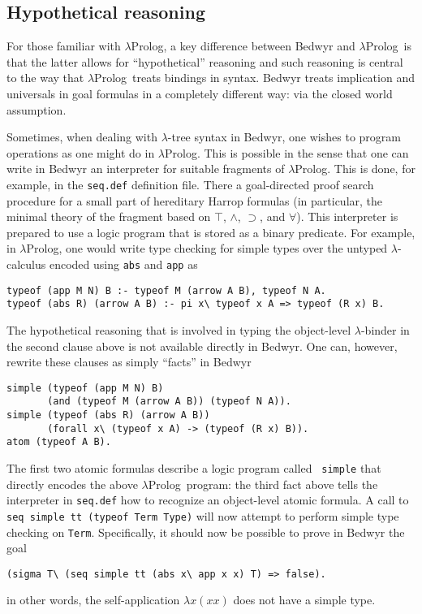 \documentclass{article}
\newcommand{\lp}{$\lambda$Prolog}
\begin{document}
\subsection{Hypothetical reasoning}

For those familiar with \lp, a key difference between
Bedwyr and \lp\ is that the latter allows for ``hypothetical''
reasoning and such reasoning is central to the way that \lp\ treats
bindings in syntax.    Bedwyr treats implication and universals in
goal formulas in a completely different way: via the closed world
assumption.  

Sometimes, when dealing with $\lambda$-tree syntax in Bedwyr, one
wishes to program operations as one might do in \lp.  This is possible
in the sense that one can write in Bedwyr an interpreter for suitable
fragments of \lp.  This is done, for example, in the {\tt seq.def}
definition file.  There a goal-directed proof search procedure for a
small part of hereditary Harrop formulas (in particular, the minimal
theory of the fragment based on $\top$, $\wedge$, $\supset$, and
$\forall$).  This interpreter is prepared to use a logic program that
is stored as a binary predicate.  For example, in \lp, one would write
type checking for simple types over the untyped $\lambda$-calculus
encoded using {\tt abs} and {\tt app} as
\begin{verbatim}
typeof (app M N) B :- typeof M (arrow A B), typeof N A.
typeof (abs R) (arrow A B) :- pi x\ typeof x A => typeof (R x) B.
\end{verbatim}
The hypothetical reasoning that is involved in typing the object-level
$\lambda$-binder in the second clause above is not available directly
in Bedwyr.  One can, however, rewrite these clauses as simply
``facts'' in Bedwyr
\begin{verbatim}
simple (typeof (app M N) B) 
       (and (typeof M (arrow A B)) (typeof N A)).
simple (typeof (abs R) (arrow A B)) 
       (forall x\ (typeof x A) -> (typeof (R x) B)).
atom (typeof A B).
\end{verbatim}
The first two atomic formulas describe a logic program called {\tt
simple} that directly encodes the above \lp\ program: the third fact
above tells the interpreter in {\tt seq.def} how to recognize an
object-level atomic formula.  A call to
\verb+seq simple tt (typeof Term Type)+ will now attempt to perform
simple type checking on {\tt Term}.  Specifically, it should now be
possible to prove in Bedwyr the goal
\begin{verbatim}
(sigma T\ (seq simple tt (abs x\ app x x) T) => false).
\end{verbatim}
in other words, the self-application $\lambda x(x x)$ does not have a
simple type.
\end{document}
